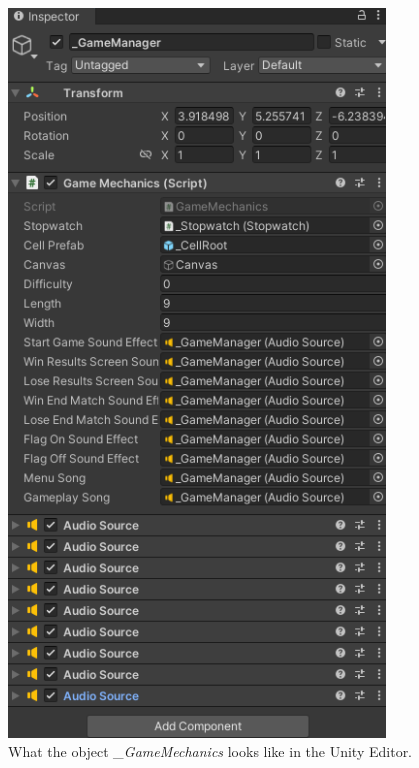 \begin{figure}[!htpb]
    \centering
    \includegraphics[width=10cm]{Images/UEViewGM.png}
       \caption{What the object \textit{\_GameMechanics} looks like in the Unity Editor.}
           \label{Fig:UEViewGM}
\end{figure}

